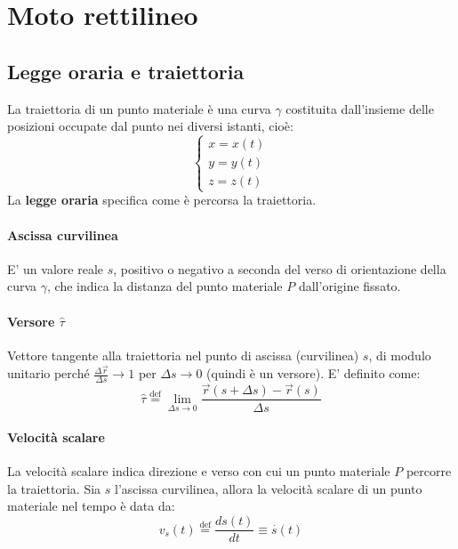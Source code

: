 \section{Moto rettilineo}



\subsection{Legge oraria e traiettoria}
La traiettoria di un punto materiale è una curva $\gamma$ costituita dall'insieme delle posizioni occupate dal punto 
nei diversi istanti, cioè: 
\begin{equation} 
\begin{cases}x=x(t)\\ y=y(t) \\ z=z(t)\end{cases}
\end{equation}
La \textbf{legge oraria} specifica come è percorsa la traiettoria.

\paragraph{Ascissa curvilinea}
E' un valore reale $s$, positivo o negativo a seconda del verso di orientazione della curva $\gamma$, che indica la distanza del 
punto materiale $P$ dall'origine fissato.



\paragraph{Versore $\hat \tau$}
 Vettore tangente alla traiettoria nel punto di ascissa (curvilinea) $s$, di modulo unitario 
perché $\frac{\Delta \overset{\to}{r}}{\Delta s} \to 1$ per $\Delta s \to 0$ (quindi è un versore).
E' definito come: \begin{equation} 
	\hat \tau \overset{\text {def}}{=}\lim _{\Delta s\to 0}\frac{\overset{\to}{r}(s+\Delta s)-\overset{\to}{r}(s)}{\Delta s}
\end{equation}


\paragraph{Velocità scalare} 
La velocità scalare indica direzione e verso con cui un punto materiale $P$ percorre la traiettoria. 
Sia $s$ l'ascissa curvilinea, allora la velocità scalare di un punto materiale nel tempo è data da: 
\begin{equation}
	v_s(t)\overset{\text {def}}{=}\frac{ds(t)}{dt}\equiv \overset{\cdot}{s}(t)
\end{equation}


 
